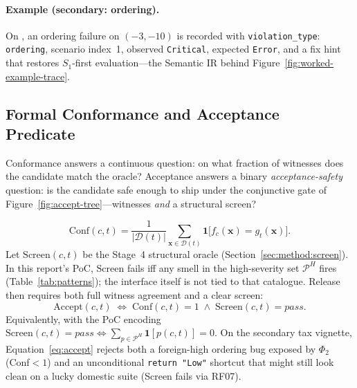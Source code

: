 \paragraph{Example (secondary: ordering).}
On , an ordering failure on $(-3,-10)$ is recorded with
\texttt{violation\_type}: \texttt{ordering}, scenario index~1, observed
\texttt{Critical}, expected \texttt{Error}, and a fix hint that restores
$S_1$-first evaluation---the Semantic IR behind
Figure~\ref{fig:worked-example-trace}.

\subsection{Formal Conformance and Acceptance Predicate}
\label{subsec:conformance-acceptance}

Conformance answers a continuous question: on what fraction of witnesses does
the candidate match the oracle?
Acceptance answers a binary \emph{acceptance-safety} question: is the
candidate safe enough to ship under the conjunctive gate of
Figure~\ref{fig:accept-tree}---witnesses \emph{and} a structural screen?

\begin{equation}
  \label{eq:conformance}
  \mathrm{Conf}(c,t) = \frac{1}{|\mathcal{D}(t)|} \sum_{\mathbf{x} \in \mathcal{D}(t)}
  \mathbf{1}\bigl[f_c(\mathbf{x}) = g_t(\mathbf{x})\bigr].
\end{equation}
Let $\mathrm{Screen}(c,t)$ be the Stage~4 structural oracle
(Section~\ref{sec:method:screen}).
In this report's PoC, $\mathrm{Screen}$ fails iff any smell in the
high-severity set $\mathcal{P}^H$ fires (Table~\ref{tab:patterns}); the
interface itself is not tied to that catalogue.
Release then requires both full witness agreement and a clear screen:
\begin{equation}
  \label{eq:accept}
  \mathrm{Accept}(c,t) \;\iff\;
  \mathrm{Conf}(c,t) = 1 \;\land\;
  \mathrm{Screen}(c,t) = \mathit{pass}.
\end{equation}
Equivalently, with the PoC encoding
$\mathrm{Screen}(c,t)=\mathit{pass} \iff
\sum_{p \in \mathcal{P}^H} \mathbf{1}[p(c,t)] = 0$.
On the secondary tax vignette, Equation~\eqref{eq:accept} rejects both a
foreign-high ordering bug exposed by $\Phi_2$ (Conf${<}1$) and an
unconditional \texttt{return "Low"} shortcut that might still look clean on
a lucky domestic suite (Screen fails via RF07).

